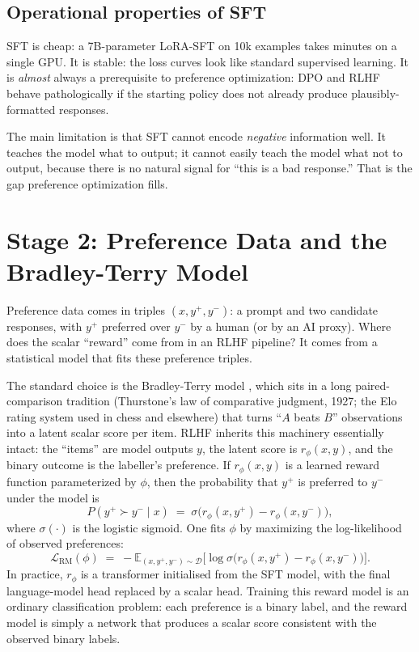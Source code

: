 \subsection{Operational properties of SFT}

SFT is cheap: a 7B-parameter LoRA-SFT on 10k examples takes minutes
on a single GPU. It is stable: the loss curves look like standard
supervised learning. It is \emph{almost} always a prerequisite to
preference optimization: DPO and RLHF behave pathologically if the
starting policy does not already produce plausibly-formatted
responses.

The main limitation is that SFT cannot encode \emph{negative}
information well. It teaches the model what to output; it cannot
easily teach the model what not to output, because there is no
natural signal for ``this is a bad response.'' That is the gap
preference optimization fills.

\section{Stage 2: Preference Data and the Bradley-Terry Model}

Preference data comes in triples $(x, y^+, y^-)$: a prompt and two
candidate responses, with $y^+$ preferred over $y^-$ by a human (or
by an AI proxy). Where does the scalar ``reward'' come from in an
RLHF pipeline? It comes from a statistical model that fits these
preference triples.

The standard choice is the Bradley-Terry model
\citep{bradley1952rank}, which sits in a long paired-comparison
tradition (Thurstone's law of comparative judgment, 1927; the
Elo rating system used in chess and elsewhere) that turns
``$A$ beats $B$'' observations into a latent scalar score per
item. RLHF inherits this machinery essentially intact: the
``items'' are model outputs $y$, the latent score is $r_\phi(x,y)$,
and the binary outcome is the labeller's preference. If
$r_\phi(x, y)$ is a learned reward function parameterized by
$\phi$, then the probability that $y^+$ is preferred to $y^-$
under the model is
\begin{equation}
  P(y^+ \succ y^- \mid x)
  \;=\;
  \sigma\big(r_\phi(x, y^+) - r_\phi(x, y^-)\big),
  \label{eq:bt}
\end{equation}
where $\sigma(\cdot)$ is the logistic sigmoid. One fits $\phi$ by
maximizing the log-likelihood of observed preferences:
\begin{equation}
  \mathcal{L}_\text{RM}(\phi)
  \;=\;
  -\mathbb{E}_{(x, y^+, y^-) \sim \mathcal{D}}
  \Big[
    \log \sigma\big(r_\phi(x, y^+) - r_\phi(x, y^-)\big)
  \Big].
  \label{eq:rm-loss}
\end{equation}
In practice, $r_\phi$ is a transformer initialised from the SFT
model, with the final language-model head replaced by a scalar
head. Training this reward model is an ordinary classification
problem: each preference is a binary label, and the reward model
is simply a network that produces a scalar score consistent with
the observed binary labels.

